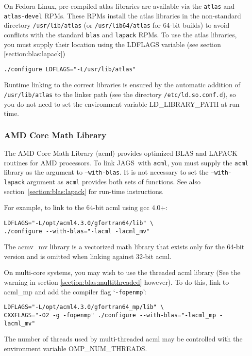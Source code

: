 \documentclass[11pt, a4paper, titlepage]{article}
\newcommand{\JAGS}{\textsf{JAGS}}
\newcommand{\code}[1]{{\bgroup{\normalfont\ttfamily #1}\egroup}}
\newcommand{\samp}[1]{{`\bgroup\normalfont\texttt{#1}'\egroup}}
\let\option=\samp
\begin{document}
On Fedora Linux, pre-compiled atlas libraries are available via the
\texttt{atlas} and \texttt{atlas-devel} RPMs.  These RPMs install the
atlas libraries in the non-standard directory \texttt{/usr/lib/atlas}
(or \texttt{/usr/lib64/atlas} for 64-bit builds) to avoid conflicts
with the standard \texttt{blas} and \texttt{lapack} RPMs. To use the
atlas libraries, you must supply their location using the
\code{LDFLAGS} variable (see section \ref{section:blas:lapack})
\begin{verbatim}
./configure LDFLAGS="-L/usr/lib/atlas"
\end{verbatim}
Runtime linking to the correct libraries is ensured by the automatic
addition of \texttt{/usr/lib/atlas} to the linker path (see the directory
\texttt{/etc/ld.so.conf.d}), so you do not need to set the
environment variable \code{LD\_LIBRARY\_PATH} at run time.

\subsubsection{AMD Core Math Library}
\label{section:acml:linux}

The AMD Core Math Library (acml) provides optimized BLAS and LAPACK
routines for AMD processors. To link \JAGS\ with \texttt{acml}, you must
supply the \texttt{acml} library as the argument to \texttt{--with-blas}.
It is not necessary to set the \texttt{--with-lapack} argument
as \texttt{acml} provides both sets of functions. See also
section~\ref{section:blas:lapack} for run-time instructions.

For example, to link to the 64-bit acml using gcc 4.0+:
\begin{verbatim}
LDFLAGS="-L/opt/acml4.3.0/gfortran64/lib" \
./configure --with-blas="-lacml -lacml_mv" 
\end{verbatim}
The \code{acmv\_mv} library is a vectorized math library that
exists only for the 64-bit version and is omitted when linking against
32-bit acml.

On multi-core systems, you may wish to use the threaded acml library
(See the warning in section \ref{section:blas:multithreaded} however).
To do this, link to \code{acml\_mp} and add the compiler flag
\option{-fopenmp}:
\begin{verbatim}
LDFLAGS="-L/opt/acml4.3.0/gfortran64_mp/lib" \
CXXFLAGS="-O2 -g -fopenmp" ./configure --with-blas="-lacml_mp -lacml_mv" 
\end{verbatim}
The number of threads used by multi-threaded acml may be controlled
with the environment variable \code{OMP\_NUM\_THREADS}.
\end{document}
